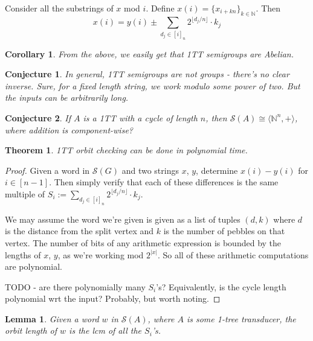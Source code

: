 \documentclass[11pt]{book}
\theoremstyle{pleasant}
\newtheorem{theorem}{Theorem}
\newtheorem{corollary}{Corollary}
\newtheorem{lemma}{Lemma}
\newtheorem{conjecture}{Conjecture}
\newcommand{\0}{\underline{0}}
\newcommand{\1}{\underline{1}}
\newcommand{\2}{\underline{2}}
\newcommand{\N}{\mathbb{N}}
\renewcommand{\S}{\mathcal{S}}
\begin{document}
Consider all the substrings of $x$ mod $i$. Define $x(i) = \{x_{i+kn}\}_{k\in\N}$. Then
$$x(i) = y(i) \pm \sum_{d_j \in [i]_n} 2^{\lfloor d_j / n\rfloor} \cdot k_j$$

\begin{corollary}
From the above, we easily get that 1TT semigroups are Abelian.
\end{corollary}

\begin{conjecture}
In general, 1TT semigroups are not groups - there's no clear inverse. Sure, for a fixed length string, we work modulo some power of two. But the inputs can be arbitrarily long.
\end{conjecture}

\begin{conjecture}
If $A$ is a 1TT with a cycle of length $n$, then $\S(A) \cong \langle \N^n, + \rangle$, where addition is component-wise?
\end{conjecture}

\begin{theorem}
1TT orbit checking can be done in polynomial time.
\end{theorem}
\begin{proof}
Given a word in $\S(G)$ and two strings $x$, $y$, determine $x(i) - y(i)$ for $i \in [n-1]$. Then simply verify that each of these differences is the same multiple of $S_i := \sum_{d_j \in [i]_n} 2^{\lfloor d_j / n\rfloor} \cdot k_j$.

We may assume the word we're given is given as a list of tuples $(d, k)$ where $d$ is the distance from the split vertex and $k$ is the number of pebbles on that vertex. The number of bits of any arithmetic expression is bounded by the lengths of $x$, $y$, as we're working mod $2^{|x|}$. So all of these arithmetic computations are polynomial.

TODO - are there polynomially many $S_i$'s? Equivalently, is the cycle length polynomial wrt the input? Probably, but worth noting.
\end{proof}

\begin{lemma}
Given a word $w$ in $\S(A)$, where $A$ is some 1-tree transducer, the orbit length of $w$ is the lcm of all the $S_i$'s.
\end{lemma}

\end{document}
